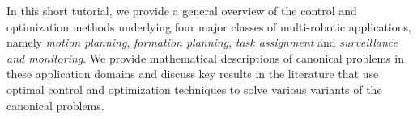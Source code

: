 In this short tutorial, we provide a general overview of the control and optimization methods underlying four major classes of multi-robotic applications, namely \emph{motion planning}, \emph{formation planning}, \emph{task assignment} and \emph{surveillance and monitoring}. We provide mathematical descriptions of canonical problems in these application domains and discuss key results in the literature that use optimal control and optimization techniques to solve various variants of the canonical problems.  

